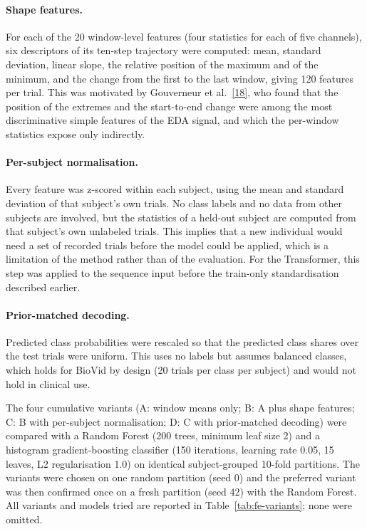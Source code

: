 \paragraph{Shape features.} For each of the 20 window-level features (four statistics for each of five channels), six descriptors of its ten-step trajectory were computed: mean, standard deviation, linear slope, the relative position of the maximum and of the minimum, and the change from the first to the last window, giving 120 features per trial. This was motivated by Gouverneur et al.\ \hyperlink{ref18}{[18]}, who found that the position of the extremes and the start-to-end change were among the most discriminative simple features of the EDA signal, and which the per-window statistics expose only indirectly.

\paragraph{Per-subject normalisation.} Every feature was z-scored within each subject, using the mean and standard deviation of that subject's own trials. No class labels and no data from other subjects are involved, but the statistics of a held-out subject are computed from that subject's own unlabeled trials. This implies that a new individual would need a set of recorded trials before the model could be applied, which is a limitation of the method rather than of the evaluation. For the Transformer, this step was applied to the sequence input before the train-only standardisation described earlier.

\paragraph{Prior-matched decoding.} Predicted class probabilities were rescaled so that the predicted class shares over the test trials were uniform. This uses no labels but assumes balanced classes, which holds for BioVid by design (20 trials per class per subject) and would not hold in clinical use.

The four cumulative variants (A: window means only; B: A plus shape features; C: B with per-subject normalisation; D: C with prior-matched decoding) were compared with a Random Forest (200 trees, minimum leaf size 2) and a histogram gradient-boosting classifier (150 iterations, learning rate 0.05, 15 leaves, L2 regularisation 1.0) on identical subject-grouped 10-fold partitions. The variants were chosen on one random partition (seed 0) and the preferred variant was then confirmed once on a fresh partition (seed 42) with the Random Forest. All variants and models tried are reported in Table~\ref{tab:fe-variants}; none were omitted.

